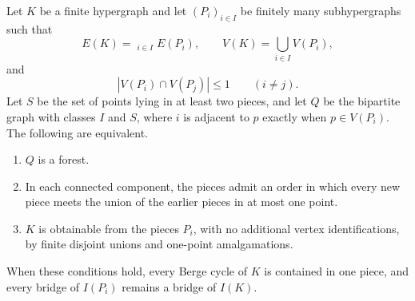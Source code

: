 
\begin{lemma}\label{lemma-forest-assembly}
Let $K$ be a finite hypergraph and let $(P_i)_{i\in I}$ be finitely many
subhypergraphs such that
\[
 E(K)=\mathop{\dot\bigcup}_{i\in I}E(P_i),
 \qquad
 V(K)=\bigcup_{i\in I}V(P_i),
\]
and
\[
 |V(P_i)\cap V(P_j)|\le1
 \qquad(i\ne j).
 \tag{2.1}
\]
Let $S$ be the set of points lying in at least two pieces, and let $Q$ be the
bipartite graph with classes $I$ and $S$, where $i$ is adjacent to $p$ exactly
when $p\in V(P_i)$.  The following are equivalent.
\begin{enumerate}
\item $Q$ is a forest.
\item In each connected component, the pieces admit an order in which every
new piece meets the union of the earlier pieces in at most one point.
\item $K$ is obtainable from the pieces $P_i$, with no additional vertex
identifications, by finite disjoint unions and one-point amalgamations.
\end{enumerate}
When these conditions hold, every Berge cycle of $K$ is contained in one piece,
and every bridge of $I(P_i)$ remains a bridge of $I(K)$.
\end{lemma}

